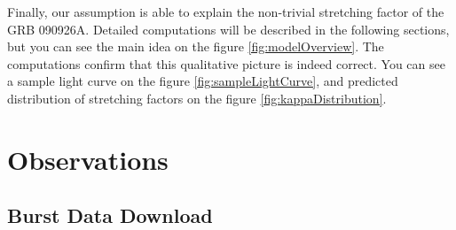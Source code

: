 \documentclass{article}
\begin{document}
Finally, our assumption is able to explain the non-trivial stretching factor of the GRB 090926A. Detailed computations will be described in the following sections, but you can see the main idea on the figure \ref{fig:modelOverview}. The computations confirm that this qualitative picture is indeed correct. You can see a sample light curve on the figure \ref{fig:sampleLightCurve}, and predicted distribution of stretching factors on the figure \ref{fig:kappaDistribution}.

\section{Observations}

\subsection{Burst Data Download}
\end{document}
